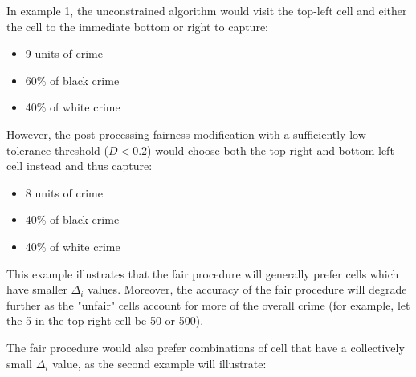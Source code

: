 \begin{table}[h]
\centering
{}
\caption{Example 1: A four-cell world}
\label{table:example1}
\end{table}

In example 1, the unconstrained algorithm would visit the top-left cell and either the cell to the immediate bottom or right to capture:
\begin{itemize}
    \item 9 units of crime
    \item 60\% of black crime
    \item 40\% of white crime
\end{itemize}
However, the post-processing fairness modification with a sufficiently low tolerance threshold ($D < 0.2$) would choose both the top-right and bottom-left cell instead and thus capture:
\begin{itemize}
    \item 8 units of crime
    \item 40\% of black crime
    \item 40\% of white crime
\end{itemize}
This example illustrates that the fair procedure will generally prefer cells which have smaller $\Delta_i$ values. Moreover, the accuracy of the fair procedure will degrade further as the "unfair" cells account for more of the overall crime (for example, let the 5 in the top-right cell be 50 or 500).

The fair procedure would also prefer combinations of cell that have a collectively small $\Delta_i$ value, as the second example will illustrate:
\begin{table}[ht]
\centering
{}
\caption{Example 2: Another four-cell world}
\label{table:example2}
\end{table}

